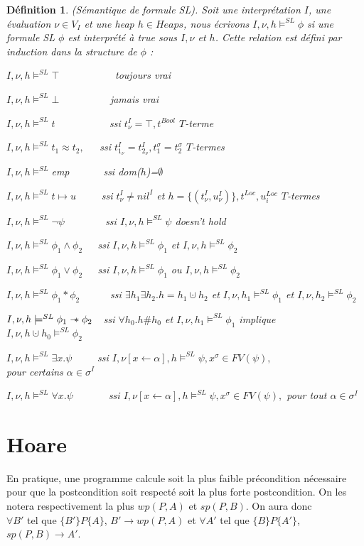 \documentclass[9pt]{book}
\newcommand\sepimp{\mathrel{-\mkern-6mu*}}
\newtheorem{definition}{D\'efinition}[section]
\begin{document}
	\begin{definition}
	(S\'emantique de formule SL). Soit une interpr\'etation $I$, une \'evaluation $\nu\in V_{I}$ et une heap $h\in Heaps$, nous \'ecrivons $I,\nu,h\models^{SL}\phi$ si une formule SL $\phi$ est interpr\'et\'e \`a true sous $I,\nu$ et $h$. Cette relation est d\'efini par induction  dans la structure de $\phi$ :\par
	$I,\nu,h\models^{SL}\top$~~~~~~~~~~~toujours vrai\par
$I,\nu,h\models^{SL}\bot$~~~~~~~~~~jamais vrai\par
$I,\nu,h\models^{SL} t$~~~~~~~~~~ ssi $t^{I}_{\nu}=\top,t^{Bool}$ $T$-terme\par
$I,\nu,h\models^{SL} t_{1}\approx t_{2},$~~~ssi $t^{I}_{1_{\nu}}=t^{I}_{2_{\nu}},t^{\sigma}_{1}=t^{\sigma}_{2}$ $T$-termes\par
$I,\nu,h\models^{SL}$emp ~~~~~~ssi dom($h$)=$\emptyset$\par
$I,\nu,h\models^{SL}t\mapsto u$~~~~~ssi $t^{I}_{\nu}\neq nil^{I}$ et $h = \{(t^{I}_{\nu},u^{I}_{\nu} )\}, t^{Loc}, u^{Loc}_{i}$ $T$-termes \par
$I,\nu,h\models^{SL}\neg\psi$~~~~~~~~ssi $I,\nu,h\models^{SL}\psi$ doesn't hold\par
$I,\nu,h\models^{SL}\phi_{1}\land\phi_{2}$~~~ssi $I,\nu,h\models^{SL}\phi_{1}$ et $I,\nu,h\models^{SL}\phi_{2}$\par
$I,\nu,h\models^{SL}\phi_{1}\lor\phi_{2}$~~~ssi $I,\nu,h\models^{SL}\phi_{1}$ ou $I,\nu,h\models^{SL}\phi_{2}$\par
$I,\nu,h\models^{SL}\phi_{1}*\phi_{2}$~~~~~~ssi $\exists h_{1}\exists h_{2}.h=h_{1}\cupdot h_{2}$ et $I,\nu,h_{1}\models^{SL}\phi_{1}$ et $I,\nu,h_{2}\models^{SL}\phi_{2}$\par
$I,\nu,h\models^{SL}\phi_{1}\sepimp\phi_{2}$~~ssi $\forall h_{0}.h\#h_{0}$ et $I,\nu,h_{1}\models^{SL}\phi_{1}$ implique \\$I,\nu,h\cupdot h_{0}\models^{SL}\phi_{2}$\par
$I,\nu,h\models^{SL}\exists x.\psi$~~~~~ssi $I,\nu[x\leftarrow\alpha],h\models^{SL}\psi, x^{\sigma}\in FV(\psi),$ \\pour certains $\alpha\in\sigma^{I}$\par
$I,\nu,h\models^{SL}\forall x.\psi$~~~~~~~ssi $I,\nu[x\leftarrow\alpha],h\models^{SL}\psi, x^{\sigma}\in FV(\psi),$ pour tout $\alpha\in\sigma^{I}$
	\end{definition}
	\section{Hoare}
	En pratique, une programme calcule soit la plus faible pr\'econdition n\'ecessaire pour que la postcondition soit respect\'e soit la plus forte postcondition. On les notera respectivement la plus $wp(P,A)$ et $sp(P, B)$. On aura donc \\$\forall B'$ tel que $\{B'\}P\{A\}$, $B' \rightarrow wp(P,A)$ et $\forall A'$ tel que $\{B\}P\{A'\}$, $sp(P,B) \rightarrow A'$. 
\end{document}
